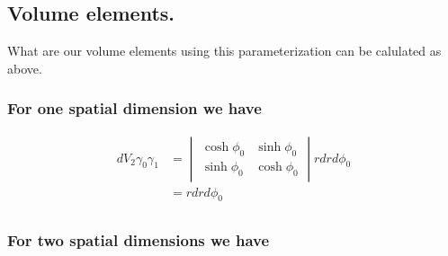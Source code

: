 \documentclass{article}
\begin{document}
\subsection{ Volume elements. }

What are our volume elements using this parameterization can be calulated as above.

\subsubsection{ For one spatial dimension we have }

\begin{align*}
dV_2 \gamma_0 \gamma_1 
&=
\begin{vmatrix}
\cosh \phi_0 & \sinh\phi_0  \\
\sinh \phi_0 & \cosh\phi_0 
\end{vmatrix} r dr d\phi_0 \\
&=
r dr d\phi_0 \\
\end{align*}

\subsubsection{ For two spatial dimensions we have }
\end{document}
